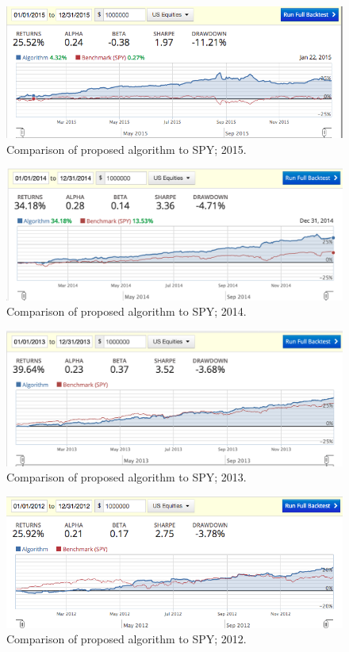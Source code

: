 \documentclass{article}
\begin{document}
\begin{figure}
\includegraphics[scale=0.5,bb=0 0 640 480]{figures/mad_mfd_macd_2015.png}
\caption{Comparison of proposed algorithm to SPY; 2015.}
\label{fig:backtest-2015}
\end{figure}

\begin{figure}
\includegraphics[scale=0.5,bb=0 0 640 480]{figures/mad_mfd_macd_2014.png}
\caption{Comparison of proposed algorithm to SPY; 2014.}
\label{fig:backtest-2014}
\end{figure}

\begin{figure}
\includegraphics[scale=0.5,bb=0 0 640 480]{figures/mad_mfd_macd_2013.png}
\caption{Comparison of proposed algorithm to SPY; 2013.}
\label{fig:backtest-2013}
\end{figure}

\begin{figure}
\includegraphics[scale=0.5,bb=0 0 640 480]{figures/mad_mfd_macd_2012.png}
\caption{Comparison of proposed algorithm to SPY; 2012.}
\label{fig:backtest-2012}
\end{figure}
\end{document}
